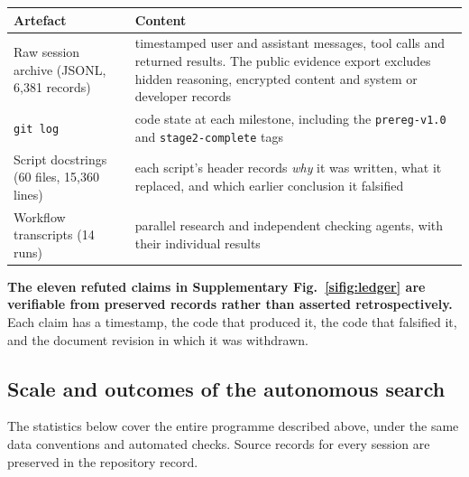 {\def\LTcaptype{none} %
\begin{longtable}[]{@{}
  >{\raggedright\arraybackslash}p{}
  >{\raggedright\arraybackslash}p{}@{}}
\toprule\noalign{}
\begin{minipage}[b]{\linewidth}\raggedright
Artefact
\end{minipage} & \begin{minipage}[b]{\linewidth}\raggedright
Content
\end{minipage} \\
\midrule\noalign{}
\endhead
\bottomrule\noalign{}
\endlastfoot
Raw session archive (JSONL, 6,381 records) & timestamped user and assistant messages, tool calls and returned results. The public evidence export excludes hidden reasoning, encrypted content and system or developer records \\
\texttt{git\ log} & code state at each milestone, including the \texttt{prereg-v1.0} and \texttt{stage2-complete} tags \\
Script docstrings (60 files, 15,360 lines) & each script's header records \emph{why} it was written, what it replaced, and which earlier conclusion it falsified \\
Workflow transcripts (14 runs) & parallel research and independent checking agents, with their individual results \\
\end{longtable}
}

\textbf{The eleven refuted claims in Supplementary Fig.~\ref{sifig:ledger} are
verifiable from preserved records rather than asserted retrospectively.} Each claim
has a timestamp, the code that produced it, the code that falsified it, and the
document revision in which it was withdrawn.

\subsection{Scale and outcomes of the autonomous search}\label{s1.3-run-statistics}

The statistics below cover the entire programme described above, under the
same data conventions and automated checks. Source records for every session are
preserved in the repository record.

